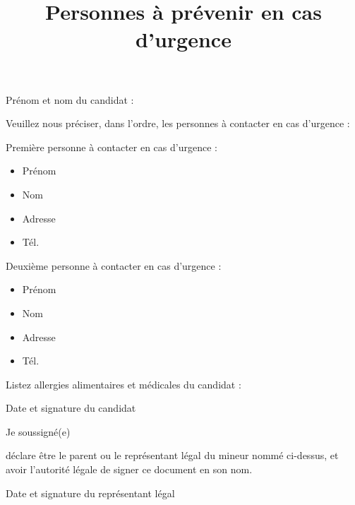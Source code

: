\documentclass[a4paper,11pt]{prologin}
\title{Personnes à prévenir en cas d'urgence}
\begin{document}
Prénom et nom du candidat : \hrulefill

Veuillez nous préciser, dans l'ordre, les personnes à contacter en cas d'urgence :

Première personne à contacter en cas d'urgence :
\begin{itemize}
    \item Prénom \hrulefill
    \item Nom \hrulefill
    \item Adresse \hrulefill
    \item Tél. \hrulefill
\end{itemize}\vspace\baselineskip

Deuxième personne à contacter en cas d'urgence :
\begin{itemize}
    \item Prénom \hrulefill
    \item Nom \hrulefill
    \item Adresse \hrulefill
    \item Tél. \hrulefill
\end{itemize}\vspace\baselineskip

Listez allergies alimentaires et médicales du candidat :

\hrulefill

\hrulefill

\begin{signatureframe}{Date et signature du candidat}\end{signatureframe}

\begin{legalrepframe}
Je soussigné(e) \hrulefill

déclare être le parent ou le représentant légal du mineur nommé
ci-dessus, et avoir l'autorité légale de signer ce document en son nom.

\begin{signatureframe}{Date et signature du représentant légal}\end{signatureframe}
\end{legalrepframe}
\end{document}
